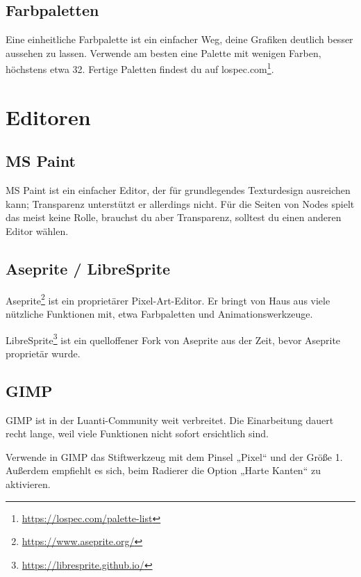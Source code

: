 \subsection{Farbpaletten}\label{farbpaletten}

Eine einheitliche Farbpalette ist ein einfacher Weg, deine Grafiken
deutlich besser aussehen zu lassen. Verwende am besten eine Palette mit
wenigen Farben, höchstens etwa 32. Fertige Paletten findest du auf
lospec.com\footnote{\url{https://lospec.com/palette-list}}.

\section{Editoren}\label{editoren}

\subsection{MS Paint}\label{ms-paint}

MS Paint ist ein einfacher Editor, der für grundlegendes Texturdesign
ausreichen kann; Transparenz unterstützt er allerdings nicht. Für die
Seiten von Nodes spielt das meist keine Rolle, brauchst du aber
Transparenz, solltest du einen anderen Editor wählen.

\subsection{Aseprite / LibreSprite}\label{aseprite-libresprite}

Aseprite\footnote{\url{https://www.aseprite.org/}} ist ein proprietärer
Pixel-Art-Editor. Er bringt von Haus aus viele nützliche Funktionen mit,
etwa Farbpaletten und Animationswerkzeuge.

LibreSprite\footnote{\url{https://libresprite.github.io/}} ist ein
quelloffener Fork von Aseprite aus der Zeit, bevor Aseprite proprietär
wurde.

\subsection{GIMP}\label{gimp}

GIMP ist in der Luanti-Community weit verbreitet. Die Einarbeitung
dauert recht lange, weil viele Funktionen nicht sofort ersichtlich sind.

Verwende in GIMP das Stiftwerkzeug mit dem Pinsel „Pixel`` und der Größe
1. Außerdem empfiehlt es sich, beim Radierer die Option „Harte Kanten``
zu aktivieren.

